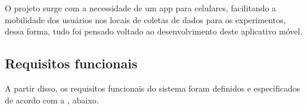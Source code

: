 O projeto surge com a necessidade de um \ac{app} para celulares, facilitando a mobilidade dos usuários nos locais de coletas de dados para os experimentos, dessa forma, tudo foi pensado voltado ao desenvolvimento deste aplicativo móvel.

\subsection{Requisitos funcionais}\label{ssec:requisitos_funcionais}
A partir disso, os requisitos funcionais do sistema foram definidos e especificados de acordo com a , abaixo.

\begin{table}[H]
\centering
{}
\end{table}
